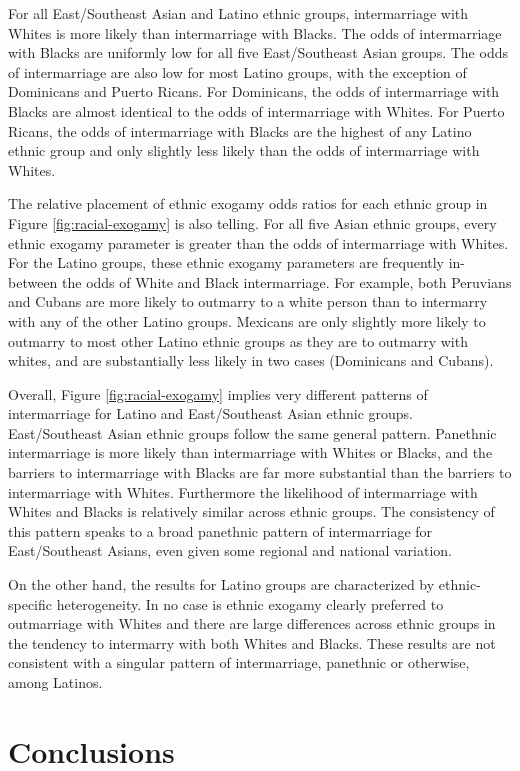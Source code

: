\documentclass[11pt,]{article}
\begin{document}
For all East/Southeast Asian and Latino ethnic groups, intermarriage with Whites is more likely than intermarriage with Blacks. The odds of intermarriage with Blacks are uniformly low for all five East/Southeast Asian groups. The odds of intermarriage are also low for most Latino groups, with the exception of Dominicans and Puerto Ricans. For Dominicans, the odds of intermarriage with Blacks are almost identical to the odds of intermarriage with Whites. For Puerto Ricans, the odds of intermarriage with Blacks are the highest of any Latino ethnic group and only slightly less likely than the odds of intermarriage with Whites.

The relative placement of ethnic exogamy odds ratios for each ethnic group in Figure \ref{fig:racial-exogamy} is also telling. For all five Asian ethnic groups, every ethnic exogamy parameter is greater than the odds of intermarriage with Whites. For the Latino groups, these ethnic exogamy parameters are frequently in-between the odds of White and Black intermarriage. For example, both Peruvians and Cubans are more likely to outmarry to a white person than to intermarry with any of the other Latino groups. Mexicans are only slightly more likely to outmarry to most other Latino ethnic groups as they are to outmarry with whites, and are substantially less likely in two cases (Dominicans and Cubans).

Overall, Figure \ref{fig:racial-exogamy} implies very different patterns of intermarriage for Latino and East/Southeast Asian ethnic groups. East/Southeast Asian ethnic groups follow the same general pattern. Panethnic intermarriage is more likely than intermarriage with Whites or Blacks, and the barriers to intermarriage with Blacks are far more substantial than the barriers to intermarriage with Whites. Furthermore the likelihood of intermarriage with Whites and Blacks is relatively similar across ethnic groups. The consistency of this pattern speaks to a broad panethnic pattern of intermarriage for East/Southeast Asians, even given some regional and national variation.

On the other hand, the results for Latino groups are characterized by ethnic-specific heterogeneity. In no case is ethnic exogamy clearly preferred to outmarriage with Whites and there are large differences across ethnic groups in the tendency to intermarry with both Whites and Blacks. These results are not consistent with a singular pattern of intermarriage, panethnic or otherwise, among Latinos.

\hypertarget{conclusions}{%
\section{Conclusions}\label{conclusions}}
\end{document}
